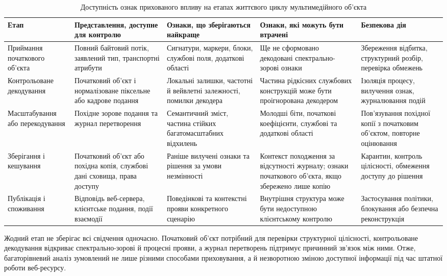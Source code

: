 \begin{table}[H]
\caption{Доступність ознак прихованого впливу на етапах життєвого циклу мультимедійного об’єкта}
\label{tab:lifecycle_evidence}
\centering
\scriptsize
\begin{tabularx}{\textwidth}{>{\raggedright\arraybackslash}p{}>{\raggedright\arraybackslash}p{}YYY}
\toprule
\textbf{Етап} & \textbf{Представлення, доступне для контролю} & \textbf{Ознаки, що зберігаються найкраще} & \textbf{Ознаки, які можуть бути втрачені} & \textbf{Безпекова дія} \\
\midrule
Приймання початкового об’єкта & Повний байтовий потік, заявлений тип, транспортні атрибути & Сигнатури, маркери, блоки, службові поля, додаткові області & Ще не сформовано декодовані спектрально-зорові ознаки & Збереження відбитка, структурний розбір, перевірка обмежень \\
Контрольоване декодування & Початковий об’єкт і нормалізоване піксельне або кадрове подання & Локальні залишки, частотні й вейвлетні залежності, помилки декодера & Частина рідкісних службових конструкцій може бути проігнорована декодером & Ізоляція процесу, вилучення ознак, журналювання подій \\
Масштабування або перекодування & Похідне зорове подання та журнал перетворення & Семантичний зміст, частина стійких багатомасштабних відхилень & Молодші біти, початкові коефіцієнти, службові та додаткові області & Пов’язування похідної копії з початковим об’єктом, повторне оцінювання \\
Зберігання і кешування & Початковий об’єкт або похідна копія, службові дані сховища, права доступу & Раніше вилучені ознаки та рішення за умови незмінності & Контекст походження за відсутності журналу; ознаки початкового об’єкта, якщо збережено лише копію & Карантин, контроль цілісності, обмеження доступу до рішення \\
Публікація і споживання & Відповідь веб-сервера, клієнтське подання, події взаємодії & Поведінкові та контекстні прояви конкретного сценарію & Внутрішня структура може бути недоступною клієнтському контролю & Застосування політики, блокування або безпечна реконструкція \\
\bottomrule
\end{tabularx}
\end{table}

Жодний етап не зберігає всі свідчення одночасно. Початковий об’єкт потрібний для перевірки структурної цілісності, контрольоване декодування відкриває спектрально-зорові й процесні прояви, а журнал перетворень підтримує причинний зв’язок між ними. Отже, багаторівневий аналіз зумовлений не лише різними способами приховування, а й незворотною зміною доступної інформації під час штатної роботи веб-ресурсу.

